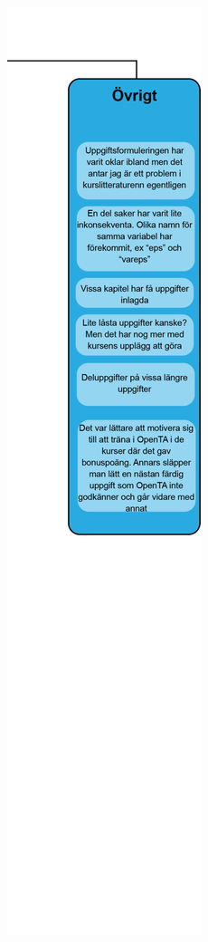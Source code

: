 \begin{figure}[hbtp]
    \centering
    \includegraphics[scale=0.454,angle=90]{appendix/appendix_blue/nr8_part3.png}
    \caption*{}
    \label{fig:nr8_part3}
\end{figure}


